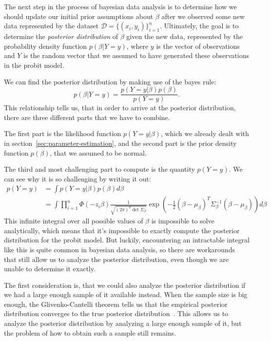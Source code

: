 The next step in the process of bayesian data analysis
is to determine how we should update our initial prior
assumptions about $\beta$ after we observed some new data
represented by the dataset $\mathcal{D} = \{(x_i, y_i)\}_{i=1}^n$.
Ultimately, the goal is to determine the
\textit{posterior distribution} of $\beta$ given the new data,
represented by the probability density function
$p(\beta | Y=y)$, where $y$ is the
vector of observations and $Y$ is the random vector that we
assumed to have generated these observations in the probit model.

We can find the posterior distribution by making use of the bayes rule:
\begin{equation}
    p(\beta | Y=y) = \frac{p(Y=y | \beta) p(\beta)}{p(Y=y)}.
\end{equation}
This relationship tells us, that in order to arrive at the
posterior distribution, there
are three different parts that we have to combine.

The first part is the likelihood function $p(Y=y|\beta)$,
which we already dealt with in section~\ref{sec:parameter-estimation}, and
the second part is the prior density function $p(\beta)$,
that we assumed to be normal.

The third and most challenging part to compute is the quantity $p(Y=y)$.
We can see why it is so challenging by writing it out:
\begin{equation}
    \begin{split}
        p(Y=y) &= \int p(Y=y|\beta)p(\beta) d\beta \\
        &= \int \prod_{i=1}^n \Phi(- z_i \beta)
        \frac{1}{\sqrt{(2\pi)^d \det{\Sigma_\beta}}}
        \exp{\left(-\frac{1}{2}(\beta - \mu_\beta)^T \Sigma_\beta^{-1}(\beta - \mu_\beta)\right)} d\beta
    \end{split}
\end{equation}
This infinite integral over all possible values of $\beta$
is impossible to solve analytically, which means that
it's impossible to exactly compute the posterior distribution
for the probit model.
But luckily, encountering an intractable integral like this
is quite common in bayesian data analysis, so
there are workarounds that still allow us to analyze the
posterior distribution, even though we are unable
to determine it exactly.

The first consideration is, that we could also analyze the posterior
distribution if we had a large enough sample of it available instead.
When the sample size is big enough, the Glivenko-Cantelli theorem
tells us that the empirical posterior distribution converges
to the true posterior distribution~\cite{glivenko-cantelli}.
This allows us to analyze the posterior
distribution by analyzing a large enough sample of it,
but the problem of how to obtain such a sample still remains.

